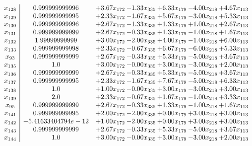 \documentclass[8pt]{article}
\begin{document}
\[\begin{array}{c| c c@{\hskip 2pt} c@{\hskip 2pt} c@{\hskip 2pt} c@{\hskip 2pt} c@{\hskip 2pt} }
 x_{128}   &  0.999999999996 & +  3.67 x_{172} & -1.33 x_{335} & +  6.33 x_{179} & -4.00 x_{218} & +  4.67 x_{113}\\
 x_{129}   &  0.999999999995 & +  2.33 x_{172} & -1.67 x_{335} & +  5.67 x_{179} & -3.00 x_{218} & +  5.33 x_{113}\\
 x_{130}   &  0.999999999996 & +  2.67 x_{172} & -1.33 x_{335} & +  1.33 x_{179} & +  1.00 x_{218} & +  2.67 x_{113}\\
 x_{131}   &  0.999999999999 & +  2.67 x_{172} & -0.33 x_{335} & +  1.33 x_{179} & -1.00 x_{218} & +  1.67 x_{113}\\
 x_{132}   &  1.99999999999 & +  3.00 x_{172} & -2.00 x_{335} & +  4.00 x_{179} & -1.00 x_{218} & +  6.00 x_{113}\\
 x_{133}   &  0.999999999998 & +  2.33 x_{172} & -0.67 x_{335} & +  6.67 x_{179} & -6.00 x_{218} & +  5.33 x_{113}\\
 x_{93}   &  0.999999999999 & +  2.67 x_{172} & -0.33 x_{335} & +  5.33 x_{179} & -5.00 x_{218} & +  3.67 x_{113}\\
 x_{135}   &  1.0 & +  3.00 x_{172} & -0.00 x_{335} & +  3.00 x_{179} & -3.00 x_{218} & +  2.00 x_{113}\\
 x_{136}   &  0.999999999999 & +  2.67 x_{172} & -0.33 x_{335} & +  5.33 x_{179} & -5.00 x_{218} & +  3.67 x_{113}\\
 x_{137}   &  0.999999999995 & +  2.33 x_{172} & -1.67 x_{335} & +  7.67 x_{179} & -5.00 x_{218} & +  6.33 x_{113}\\
 x_{138}   &  1.0 & +  1.00 x_{172} & -0.00 x_{335} & +  3.00 x_{179} & -3.00 x_{218} & +  3.00 x_{113}\\
 x_{139}   &  2.0 & +  2.33 x_{172} & -0.67 x_{335} & +  1.67 x_{179} & -1.00 x_{218} & +  3.33 x_{113}\\
 x_{95}   &  0.999999999999 & +  2.67 x_{172} & -0.33 x_{335} & +  1.33 x_{179} & -1.00 x_{218} & +  1.67 x_{113}\\
 x_{141}   &  0.999999999995 & +  2.00 x_{172} & -2.00 x_{335} & +  0.00 x_{179} & +  3.00 x_{218} & +  3.00 x_{113}\\
 x_{142}   &  -5.41633404794e-12 & +  1.00 x_{172} & -2.00 x_{335} & +  0.00 x_{179} & +  3.00 x_{218} & +  3.00 x_{113}\\
 x_{143}   &  0.999999999999 & +  2.67 x_{172} & -0.33 x_{335} & +  5.33 x_{179} & -5.00 x_{218} & +  3.67 x_{113}\\
 x_{144}   &  1.0 & +  3.00 x_{172} & -0.00 x_{335} & +  3.00 x_{179} & -3.00 x_{218} & +  2.00 x_{113}\\

\end{array}\]
\end{document}
